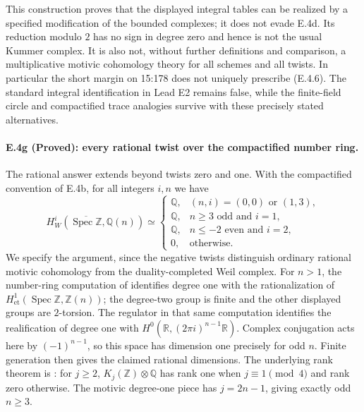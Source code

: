 This construction proves that the displayed integral tables can be
realized by a specified modification of the bounded complexes; it
does not evade E.4d. Its reduction modulo $2$ has no sign in degree
zero and hence is not the usual Kummer complex. It is also not,
without further definitions and comparison, a multiplicative motivic
cohomology theory for all schemes and all twists. In particular the
short margin on 15:178 does not uniquely prescribe (E.4.6).
The standard integral identification in Lead E2 remains false, while
the finite-field circle and compactified trace analogies survive with
these precisely stated alternatives.

\paragraph{E.4g (Proved): every rational twist over the compactified number ring.}
The rational answer extends beyond twists zero and one. With the
compactified convention of E.4b, for all integers $i,n$ we have
\[
 H_W^i(\overline{\operatorname{Spec}\mathbb Z},\mathbb Q(n))
 \simeq
 \begin{cases}
 \mathbb Q,&(n,i)=(0,0)\text{ or }(1,3),\\
 \mathbb Q,&n\geq3\text{ odd and }i=1,\\
 \mathbb Q,&n\leq-2\text{ even and }i=2,\\
 0,&\text{otherwise}.
 \end{cases}
 \tag{E.4.7}
\]
We specify the argument, since the negative twists distinguish ordinary
rational motivic cohomology from the duality-completed Weil complex.
For $n>1$, the number-ring computation of
\citet[\S5.8.3, pp.~1503--1504]{D_FlachMorin2018} identifies degree one
with the rationalization of $H^1_{\mathrm{et}}(\operatorname{Spec}\mathbb Z,
\mathbb Z(n))$; the degree-two group is finite and the other displayed
groups are $2$-torsion. The regulator in that same computation identifies
the realification of degree one with
$H^0(\mathbb R,(2\pi i)^{n-1}\mathbb R)$.
Complex conjugation acts here by $(-1)^{n-1}$, so this space has dimension
one precisely for odd $n$. Finite generation then gives the claimed
rational dimensions. The underlying rank theorem is
\citet[Proposition 12.2, p.~271]{D_Borel1974}: for $j\geq2$,
$K_j(\mathbb Z)\otimes\mathbb Q$ has rank one when $j\equiv1\pmod4$
and rank zero otherwise. The motivic degree-one piece has
$j=2n-1$, giving exactly odd $n\geq3$.

